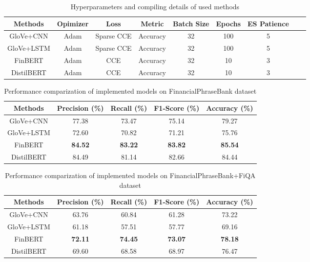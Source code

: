 \begin{table}[!ht]
  \centering
  \begin{tabular}{c|c|c|c|c|c|c|c|c}
    Methods & Opimizer & Loss & Metric & Batch Size & Epochs & ES Patience\\
    \midrule
    GloVe+CNN & Adam & Sparse CCE & Accuracy & 32 & 100 & 5 \\
    GloVe+LSTM & Adam & Sparse CCE & Accuracy & 32 & 100 & 5\\
    FinBERT & Adam & CCE & Accuracy & 32 & 10 & 3\\
    DistilBERT & Adam & CCE & Accuracy & 32 & 10 & 3\\
    \bottomrule
  \end{tabular}
  \caption{Hyperparameters and compiling details of used methods}
  \label{tab:hyper-parameter}
\end{table}

\begin{table}[!ht]
  \centering
  \begin{tabular}{c|c|c|c|c}
    Methods & Precision (\%) & Recall (\%) & F1-Score (\%) & Accuracy (\%) \\
    \midrule
    GloVe+CNN & 77.38 & 73.47 & 75.14 & 79.27 \\
    GloVe+LSTM & 72.60 & 70.82 & 71.21 & 75.76 \\
    FinBERT & \textbf{84.52} & \textbf{83.22} & \textbf{83.82} & \textbf{85.54} \\
    DistilBERT & 84.49 & 81.14 & 82.66 & 84.44 \\
    \bottomrule
  \end{tabular}
  \caption{Performance comparization of implemented models on FinancialPhraseBank dataset}
  \label{tab:performance1}
\end{table}

\begin{table}[!ht]
  \centering
  \begin{tabular}{c|c|c|c|c}
    Methods & Precision (\%) & Recall (\%) & F1-Score (\%) & Accuracy (\%) \\
    \midrule
    GloVe+CNN & 63.76 & 60.84 & 61.28 & 73.22 \\
    GloVe+LSTM & 61.18 & 57.51 & 57.77 & 69.16 \\
    FinBERT & \textbf{72.11} & \textbf{74.45} & \textbf{73.07} & \textbf{78.18} \\
    DistilBERT & 69.60 & 68.58 & 68.97 & 76.47 \\
    \bottomrule
  \end{tabular}
  \caption{Performance comparization of implemented models on FinancialPhraseBank+FiQA dataset}
  \label{tab:performance2}
\end{table}

